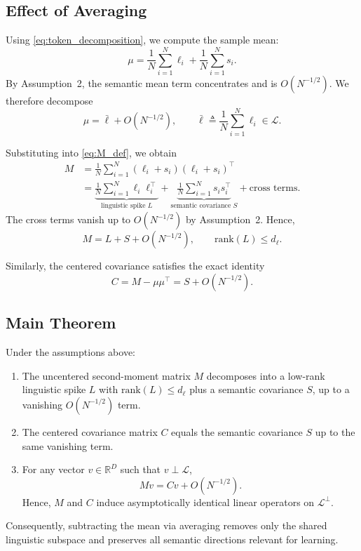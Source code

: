 \subsection{Effect of Averaging}

Using \eqref{eq:token_decomposition}, we compute the sample mean:
\[
\mu
= \frac{1}{N}\sum_{i=1}^N \ell_i
  + \frac{1}{N}\sum_{i=1}^N s_i.
\]
By Assumption~2, the semantic mean term concentrates and is $O(N^{-1/2})$.
We therefore decompose
\[
\mu = \bar{\ell} + O(N^{-1/2}),
\qquad
\bar{\ell} \triangleq \frac{1}{N}\sum_{i=1}^N \ell_i \in \mathcal{L}.
\]

Substituting into \eqref{eq:M_def}, we obtain
\begin{align}
M
&= \frac{1}{N}\sum_{i=1}^N (\ell_i + s_i)(\ell_i + s_i)^\top \\
&= \underbrace{\frac{1}{N}\sum_{i=1}^N \ell_i \ell_i^\top}_{\text{linguistic spike } L}
 + \underbrace{\frac{1}{N}\sum_{i=1}^N s_i s_i^\top}_{\text{semantic covariance } S}
 + \text{cross terms}.
\end{align}
The cross terms vanish up to $O(N^{-1/2})$ by Assumption~2.
Hence,
\begin{equation}
\label{eq:M_decomp}
M = L + S + O(N^{-1/2}),
\qquad
\mathrm{rank}(L) \le d_\ell.
\end{equation}

Similarly, the centered covariance satisfies the exact identity
\begin{equation}
\label{eq:C_M_relation}
C = M - \mu\mu^\top
  = S + O(N^{-1/2}).
\end{equation}

\subsection{Main Theorem}

\begin{theorem}
\label{thm:avg_removes_linguistic}
Under the assumptions above:
\begin{enumerate}
    \item The uncentered second-moment matrix $M$ decomposes into a low-rank
          linguistic spike $L$ with $\mathrm{rank}(L)\le d_\ell$ plus a semantic
          covariance $S$, up to a vanishing $O(N^{-1/2})$ term.
    \item The centered covariance matrix $C$ equals the semantic covariance $S$
          up to the same vanishing term.
    \item For any vector $v \in \mathbb{R}^D$ such that $v \perp \mathcal{L}$,
          \[
          Mv = Cv + O(N^{-1/2}).
          \]
          Hence, $M$ and $C$ induce asymptotically identical linear operators on
          $\mathcal{L}^\perp$.
\end{enumerate}
Consequently, subtracting the mean via averaging removes only the shared
linguistic subspace and preserves all semantic directions relevant for learning.
\end{theorem}

